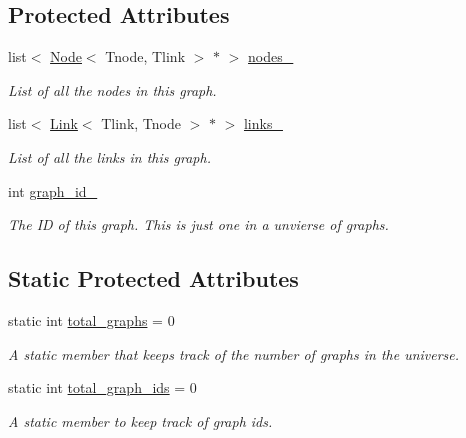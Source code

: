 \subsection*{Protected Attributes}
\begin{DoxyCompactItemize}
\item 
list$<$ \hyperlink{classNode}{Node}$<$ Tnode, Tlink $>$ $\ast$ $>$ \hyperlink{classGraph_ace44e35900691f95e5a5682e4e2327ab}{nodes\+\_\+}\hypertarget{classGraph_ace44e35900691f95e5a5682e4e2327ab}{}\label{classGraph_ace44e35900691f95e5a5682e4e2327ab}

\begin{DoxyCompactList}\small\item\em List of all the nodes in this graph. \end{DoxyCompactList}\item 
list$<$ \hyperlink{classLink}{Link}$<$ Tlink, Tnode $>$ $\ast$ $>$ \hyperlink{classGraph_a29805ae6b277e123503893d1b76fe22e}{links\+\_\+}\hypertarget{classGraph_a29805ae6b277e123503893d1b76fe22e}{}\label{classGraph_a29805ae6b277e123503893d1b76fe22e}

\begin{DoxyCompactList}\small\item\em List of all the links in this graph. \end{DoxyCompactList}\item 
int \hyperlink{classGraph_a6146b243a8de0cfe58d2855fbf61dd63}{graph\+\_\+id\+\_\+}\hypertarget{classGraph_a6146b243a8de0cfe58d2855fbf61dd63}{}\label{classGraph_a6146b243a8de0cfe58d2855fbf61dd63}

\begin{DoxyCompactList}\small\item\em The ID of this graph. This is just one in a unvierse of graphs. \end{DoxyCompactList}\end{DoxyCompactItemize}
\subsection*{Static Protected Attributes}
\begin{DoxyCompactItemize}
\item 
static int \hyperlink{classGraph_a2222ebedfb7b3cd4f1bd6717a2c1b881}{total\+\_\+graphs} = 0
\begin{DoxyCompactList}\small\item\em A static member that keeps track of the number of graphs in the universe. \end{DoxyCompactList}\item 
static int \hyperlink{classGraph_a055d56d93fbc031ff821c715b408d434}{total\+\_\+graph\+\_\+ids} = 0\hypertarget{classGraph_a055d56d93fbc031ff821c715b408d434}{}\label{classGraph_a055d56d93fbc031ff821c715b408d434}

\begin{DoxyCompactList}\small\item\em A static member to keep track of graph ids. \end{DoxyCompactList}\end{DoxyCompactItemize}


